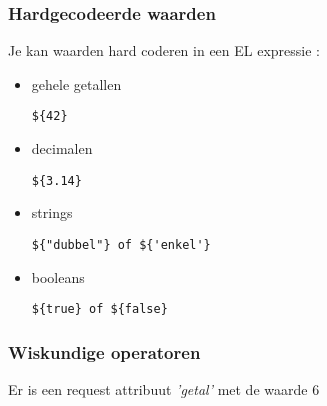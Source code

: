 \documentclass{beamer}
\begin{document}
\begin{frame}[fragile]

\frametitle{Hardgecodeerde waarden}

Je kan waarden hard coderen in een EL expressie :

\begin{itemize}
  \item gehele getallen \begin{verbatim}${42}\end{verbatim}
  \item decimalen \begin{verbatim}${3.14}\end{verbatim}
  \item strings \begin{verbatim}${"dubbel"} of ${'enkel'}\end{verbatim}
  \item booleans \begin{verbatim}${true} of ${false}\end{verbatim}  
\end{itemize}

\end{frame}


\begin{frame}[fragile]

\frametitle{Wiskundige operatoren}

Er is een request attribuut \textit{'getal'} met de waarde 6


\end{frame}
\end{document}
